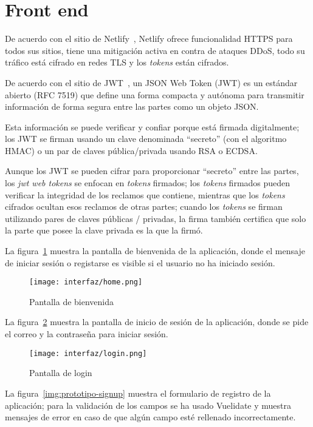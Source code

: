 
\section{Front end}

De acuerdo con el sitio de Netlify~\cite{netlify_netlify_nodate}, Netlify ofrece funcionalidad HTTPS para todos sus sitios, tiene una mitigación activa en contra de ataques DDoS, todo su tráfico está cifrado en redes TLS y los \textit{tokens} están cifrados.

De acuerdo con el sitio de JWT~\cite{jwt_web_2020}, un JSON Web Token (JWT) es un estándar abierto (RFC 7519) que define una forma compacta y autónoma para transmitir información de forma segura entre las partes como un objeto JSON.


Esta información se puede verificar y confiar porque está firmada digitalmente; los JWT se firman usando un clave denominada ``secreto'' (con el algoritmo HMAC) o un par de claves pública/privada usando RSA o ECDSA.

Aunque los JWT se pueden cifrar para proporcionar ``secreto'' entre las partes, los \textit{jwt web tokens} se enfocan en \textit{tokens} firmados; los \textit{tokens} firmados pueden verificar la integridad de los reclamos que contiene, mientras que los \textit{tokens} cifrados ocultan esos reclamos de otras partes; cuando los \textit{tokens} se firman utilizando pares de claves públicas / privadas, la firma también certifica que solo la parte que posee la clave privada es la que la firmó.


La figura~\ref{img:prototipo-welcome} muestra la pantalla de bienvenida de la aplicación, donde el mensaje de iniciar sesión o registarse es visible si el usuario no ha iniciado sesión.

\begin{figure}[H]
    \centering
    \texttt{[image: interfaz/home.png]}
    \caption{Pantalla de bienvenida}
    \label{img:prototipo-welcome}
\end{figure}

La figura~\ref{img:prototipo-login} muestra la pantalla de inicio de sesión de la aplicación, donde se pide el correo y la contraseña para iniciar sesión.


\begin{figure}[H]
    \centering
    \texttt{[image: interfaz/login.png]}
    \caption{Pantalla de login}
    \label{img:prototipo-login}
\end{figure}
La figura~\ref{img:prototipo-signup} muestra el formulario de registro de la aplicación; para la validación de los campos se ha usado Vuelidate y muestra mensajes de error en caso de que algún campo esté rellenado incorrectamente.


